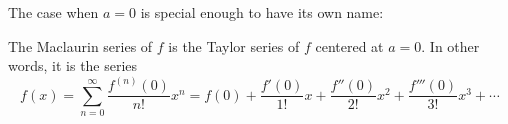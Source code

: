 \begin{frame}
The case when $a = 0$ is special enough to have its own name:
\begin{definition}
The Maclaurin series of $f$ is the Taylor series of $f$ centered at $a = 0$.  In other words, it is the series
\abovedisplayskip=0pt
\belowdisplayskip=0pt
\[
f(x) = \sum_{n=0}^\infty \frac{f^{(n)}(0)}{n!}x^n = f(0) + \frac{f'(0)}{1!}x + \frac{f''(0)}{2!}x^2 + \frac{f'''(0)}{3!}x^3 + \cdots%
\]
\end{definition}
\end{frame}
